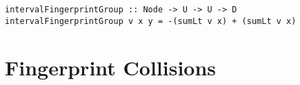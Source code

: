 \begin{verbatim}
intervalFingerprintGroup :: Node -> U -> U -> D
intervalFingerprintGroup v x y = -(sumLt v x) + (sumLt v x)
\end{verbatim}

\section{Fingerprint Collisions}
\label{collisions}







%
%
%







